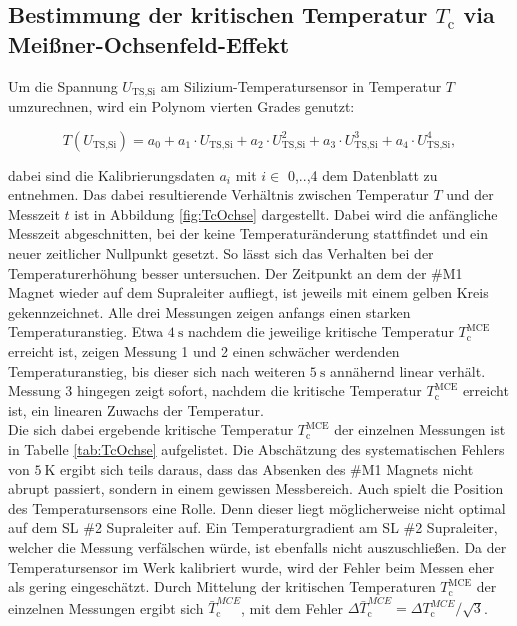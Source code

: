 \subsection{Bestimmung der kritischen Temperatur $T_{\text{c}}$ via Meißner-Ochsenfeld-Effekt}
\label{sec:TcOchse}

Um die Spannung $U_{\text{TS,Si}}$ am Silizium-Temperatursensor in Temperatur $T$
umzurechnen, wird ein Polynom vierten Grades genutzt:

\begin{equation*}
  T(U_{\text{TS,Si}}) = a_0 + a_1 \cdot U_{\text{TS,Si}} + a_2 \cdot U_{\text{TS,Si}}^2
  + a_3 \cdot U_{\text{TS,Si}}^3 + a_4 \cdot U_{\text{TS,Si}}^4,
  \label{FA1}
\end{equation*}

\noindent
dabei sind die Kalibrierungsdaten $a_{i}$ mit $i \in$ {0,..,4} dem Datenblatt
zu entnehmen. Das dabei resultierende Verhältnis zwischen Temperatur $T$ und der
Messzeit $t$ ist in Abbildung \ref{fig:TcOchse} dargestellt. Dabei wird die anfängliche
Messzeit abgeschnitten, bei der keine Temperaturänderung stattfindet und ein
neuer zeitlicher Nullpunkt gesetzt. So lässt sich das Verhalten bei der
Temperaturerhöhung besser untersuchen. Der Zeitpunkt an dem der \#M1 Magnet wieder
auf dem Supraleiter aufliegt, ist jeweils mit einem gelben Kreis gekennzeichnet.
Alle drei Messungen zeigen anfangs einen starken Temperaturanstieg. Etwa $\SI{4}{\second}$
nachdem die jeweilige kritische Temperatur $T^{\text{MCE}}_{\text{c}}$ erreicht ist, zeigen
Messung 1 und 2 einen schwächer werdenden Temperaturanstieg, bis dieser sich nach
weiteren $\SI{5}{\second}$ annähernd linear verhält. Messung 3 hingegen zeigt
sofort, nachdem die kritische Temperatur $T^{\text{MCE}}_{\text{c}}$ erreicht ist, ein linearen
Zuwachs der Temperatur.\\
Die sich dabei ergebende kritische Temperatur $T^{\text{MCE}}_{\text{c}}$ der einzelnen
Messungen ist in Tabelle \ref{tab:TcOchse} aufgelistet. Die Abschätzung des
systematischen Fehlers von $\SI{5}{\kelvin}$ ergibt sich teils daraus, dass das
Absenken des \#M1 Magnets nicht abrupt passiert, sondern in einem gewissen Messbereich.
Auch spielt die Position des Temperatursensors eine Rolle. Denn dieser liegt
möglicherweise nicht optimal auf dem SL \#2 Supraleiter auf. Ein Temperaturgradient
am SL \#2 Supraleiter, welcher die Messung verfälschen würde, ist ebenfalls nicht
auszuschließen. Da der Temperatursensor im Werk kalibriert wurde, wird der Fehler
beim Messen eher als gering eingeschätzt.
Durch Mittelung der kritischen Temperaturen $T^{\text{MCE}}_{\text{c}}$ der einzelnen Messungen
ergibt sich $\bar{T}^{MCE}_{\text{c}}$, mit dem Fehler $\Delta \bar{T}^{MCE}_{\text{c}} =
\Delta T^{MCE}_{\text{c}}/\sqrt{3}$.



